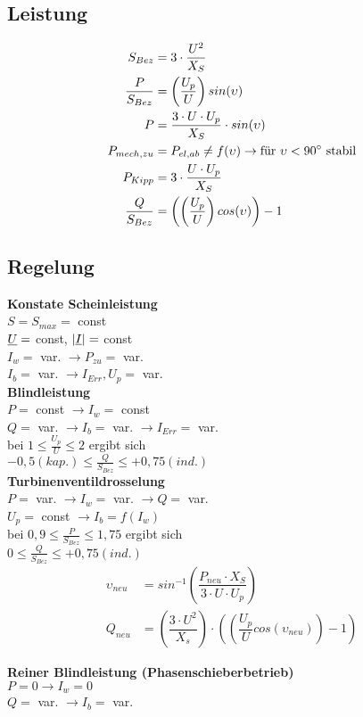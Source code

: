 \subsection{Leistung}
\begin{align*}
    S_{Bez} &= 3 \cdot \dfrac{U^2}{X_S}\\
    \dfrac{P}{S_{Bez}} &= \left(\dfrac{U_p}{U}\right) sin(\upsilon)\\
    P &= \dfrac{3 \cdot U \cdot U_p}{X_S} \cdot sin (\upsilon)\\
    P_{mech,zu} &= P_{el,ab} \neq f(\upsilon) \rightarrow \textnormal{für $\upsilon < 90\degree$ stabil}\\
    P_{Kipp} &= 3 \cdot \dfrac{U \cdot U_p}{X_S}\\
    \dfrac{Q}{S_{Bez}} &= \left(\left(\dfrac{U_p}{U}\right) cos(\upsilon)\right) -1    
\end{align*}

\subsection{Regelung}

\textbf{Konstate Scheinleistung}\\
\indent $S = S_{max} =$ const\\
\indent $\underline{U}=$ const, $|\underline{I}| =$ const\\
\indent $I_w =$ var. $\rightarrow P_{zu}=$ var.\\
\indent $I_b =$ var. $\rightarrow I_{Err}, U_p =$ var.\\

\textbf{Blindleistung}\\
\indent $P =$ const $\rightarrow I_w= $ const\\
\indent $Q =$ var. $\rightarrow I_b = $ var. $\rightarrow I_{Err}=$ var.\\
\indent bei $1 \leq \frac{U_p}{U} \leq 2$ ergibt sich \\
\indent $-0,5 (kap.) \leq \frac{Q}{S_{Bez}} \leq +0,75(ind.)$\\

\textbf{Turbinenventildrosselung}\\
\indent $P =$ var. $\rightarrow I_w= $ var. $\rightarrow Q =$ var.\\
\indent $U_p =$ const $\rightarrow I_b = f(I_w)$\\
\indent bei $0,9 \leq \frac{P}{S_{Bez}} \leq 1,75$ ergibt sich\\
\indent $0 \leq \frac{Q}{S_{Bez}} \leq +0,75(ind.)$\\

\begin{align*}
    \upsilon_{neu} &= sin^{-1}\left( \dfrac{P_{neu} \cdot X_S}{3 \cdot U \cdot U_p}\right)\\
    Q_{neu} &= \left( \dfrac{3 \cdot U^2}{X_s}\right) \cdot \left( \left( \dfrac{U_p}{U} cos( \upsilon_{neu})\right)-1\right)
\end{align*}

\textbf{Reiner Blindleistung (Phasenschieberbetrieb)}\\
\indent $P = 0 \rightarrow I_w= 0$ \\
\indent $Q =$ var. $\rightarrow I_b = $ var.
